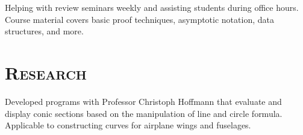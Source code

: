 \begin{resume}
\begin{formatb}
  \\
  \body\\
\end{formatb}

\begin{position}
  Helping with review seminars weekly and assisting students during office hours. Course material covers basic proof techniques, asymptotic notation, data structures, and more.
\end{position}


\section{\textsc{Research}}

\begin{position}
    Developed programs with Professor Christoph Hoffmann that evaluate and display conic sections based on the manipulation of line and circle formula. Applicable to constructing curves for airplane wings and fuselages.
\end{position}




\end{resume}
